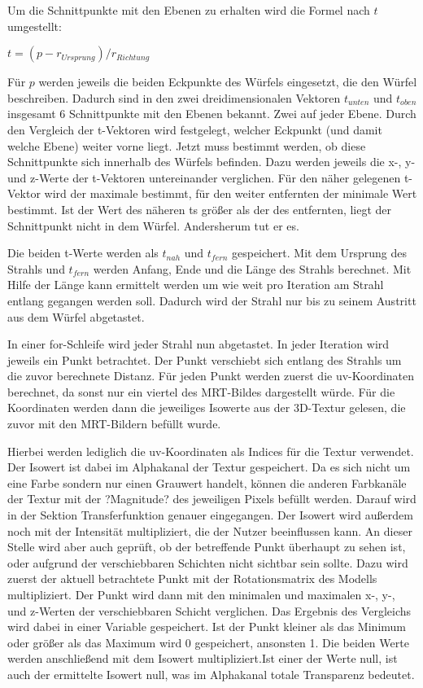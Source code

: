 Um die Schnittpunkte mit den Ebenen zu erhalten wird die Formel nach $t$ umgestellt:

$t=(p-r_{Ursprung})/r_{Richtung}$

Für $p$ werden jeweils die beiden Eckpunkte des Würfels eingesetzt, die den Würfel beschreiben. Dadurch sind in den zwei dreidimensionalen Vektoren $t_{unten}$ und $t_{oben}$ insgesamt 6 Schnittpunkte mit den Ebenen bekannt. Zwei auf jeder Ebene. Durch den Vergleich der t-Vektoren wird festgelegt, welcher Eckpunkt (und damit welche Ebene) weiter vorne liegt. 
Jetzt muss bestimmt werden, ob diese Schnittpunkte sich innerhalb des Würfels befinden.
Dazu werden jeweils die x-, y- und z-Werte der t-Vektoren untereinander verglichen. Für den näher gelegenen t-Vektor wird der maximale bestimmt, für den weiter entfernten der minimale Wert bestimmt. Ist der Wert des näheren ts größer als der des entfernten, liegt der Schnittpunkt nicht in dem Würfel. Andersherum tut er es.

Die beiden t-Werte werden als $t_{nah}$ und $t_{fern}$ gespeichert.
Mit dem Ursprung des Strahls und $t_{fern}$ werden Anfang, Ende und die Länge des Strahls berechnet. Mit Hilfe der Länge kann ermittelt werden um wie weit pro Iteration am Strahl entlang gegangen werden soll. Dadurch wird der Strahl nur bis zu seinem Austritt aus dem Würfel abgetastet. 

In einer for-Schleife wird jeder Strahl nun abgetastet. In jeder Iteration wird jeweils ein Punkt betrachtet. Der Punkt verschiebt sich entlang des Strahls um die zuvor berechnete Distanz.
Für jeden Punkt werden zuerst die uv-Koordinaten berechnet, da sonst nur ein viertel des MRT-Bildes dargestellt würde.
Für die Koordinaten werden dann die jeweiliges Isowerte aus der 3D-Textur gelesen, die zuvor mit den MRT-Bildern befüllt wurde.

Hierbei werden lediglich die uv-Koordinaten als Indices für die Textur verwendet. 
Der Isowert ist dabei im Alphakanal der Textur gespeichert. Da es sich nicht um eine Farbe sondern nur einen Grauwert handelt, können die anderen Farbkanäle der Textur mit der ?Magnitude? des jeweiligen Pixels befüllt werden. Darauf wird in der Sektion Transferfunktion genauer eingegangen.
Der Isowert wird außerdem noch mit der Intensität multipliziert, die der Nutzer beeinflussen kann.
An dieser Stelle wird aber auch geprüft, ob der betreffende Punkt überhaupt zu sehen ist, oder aufgrund der verschiebbaren Schichten nicht sichtbar sein sollte. 
Dazu wird zuerst der aktuell betrachtete Punkt mit der Rotationsmatrix des Modells multipliziert.
Der Punkt wird dann mit den minimalen und maximalen x-, y-, und z-Werten der verschiebbaren Schicht verglichen. Das Ergebnis des Vergleichs wird dabei in einer Variable gespeichert. Ist der Punkt kleiner als das Minimum oder größer als das Maximum wird 0 gespeichert, ansonsten 1. 
Die beiden Werte werden anschließend mit dem Isowert multipliziert.Ist einer der Werte null, ist auch der ermittelte Isowert null, was im Alphakanal totale Transparenz bedeutet. 


